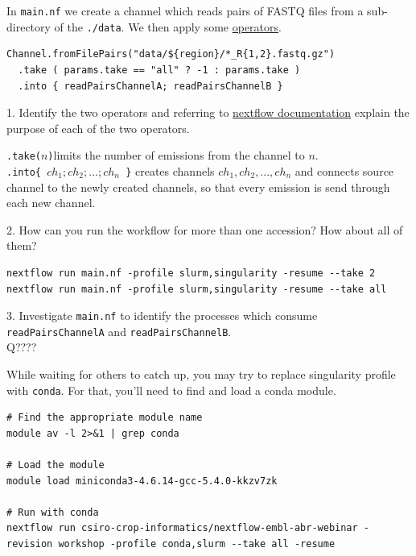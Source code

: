 \begin{questions}
In \texttt{main.nf} we create a channel which reads pairs of FASTQ files from a sub-directory of the \texttt{./data}. We then apply some \href{https://www.nextflow.io/docs/latest/operator.html}{operators}. 
\begin{verbatim}
Channel.fromFilePairs("data/${region}/*_R{1,2}.fastq.gz")
  .take ( params.take == "all" ? -1 : params.take ) 
  .into { readPairsChannelA; readPairsChannelB } 
\end{verbatim}
1. Identify the two operators and referring to \href{https://www.nextflow.io/docs/latest/operator.html}{nextflow documentation} explain the purpose of each of the two operators.\\
\begin{answer}
\texttt{.take($n$)}limits the number of emissions from the channel to $n$. \\
\texttt{.into\{ $ch_1;ch_2;...;ch_n$ \}} creates channels $ch_1,ch_2,...,ch_n$ and connects source channel to the newly created channels, so that every emission is send through each new channel.
\end{answer}

2. How can you run the workflow for more than one accession? How about all of them?
\begin{answer}
\begin{lstlisting}
nextflow run main.nf -profile slurm,singularity -resume --take 2
nextflow run main.nf -profile slurm,singularity -resume --take all
\end{lstlisting}
\end{answer}

3. Investigate \texttt{main.nf} to identify the processes which consume \texttt{readPairsChannelA} and \texttt{readPairsChannelB}. \\

Q????

\end{questions}


\begin{bonus}
While waiting for others to catch up, you may try to replace singularity profile with \texttt{conda}.
For that, you'll need to find and load a conda module.
\begin{answer}

\begin{lstlisting}
# Find the appropriate module name
module av -l 2>&1 | grep conda

# Load the module
module load miniconda3-4.6.14-gcc-5.4.0-kkzv7zk

# Run with conda
nextflow run csiro-crop-informatics/nextflow-embl-abr-webinar -revision workshop -profile conda,slurm --take all -resume

\end{lstlisting}
\end{answer}
\end{bonus}


